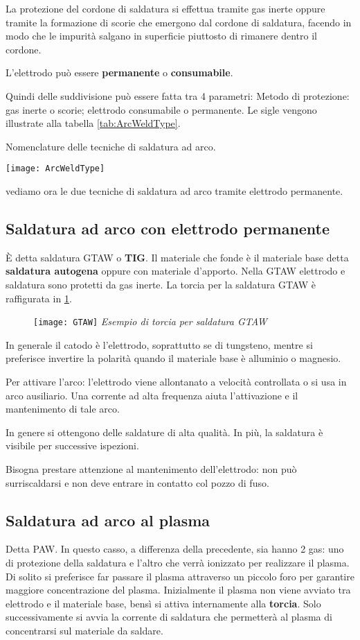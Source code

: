 La protezione del cordone di saldatura si effettua tramite gas inerte oppure tramite la formazione di scorie che emergono dal cordone di saldatura, facendo in modo che le impurità salgano in superficie piuttosto di rimanere dentro il cordone.

L'elettrodo può essere \textbf{permanente} o \textbf{consumabile}.

Quindi delle suddivisione può essere fatta tra 4 parametri: Metodo di protezione: gas inerte o scorie; elettrodo consumabile o permanente.
Le sigle vengono illustrate alla tabella \ref{tab:ArcWeldType}.

\begin{table}
\centering
\caption{Nomenclature delle tecniche di saldatura ad arco.}
\label{tab:ArcWeldType}
\texttt{[image: ArcWeldType]}
\end{table}

vediamo ora le due tecniche di saldatura ad arco tramite elettrodo permanente.

\subsection{Saldatura ad arco con elettrodo permanente}
È detta saldatura \ac{GTAW} o \textbf{TIG}.
Il materiale che fonde è il materiale base detta \textbf{saldatura autogena} oppure con materiale d'apporto.
Nella \ac{GTAW} elettrodo e saldatura sono protetti da gas inerte.
La torcia per la saldatura \ac{GTAW} è raffigurata in \ref{fig:GTAW}.
\begin{figure}
\centering
\texttt{[image: GTAW]}
\emph{Esempio di torcia per saldatura \ac{GTAW}}\label{fig:GTAW}
\end{figure}

In generale il catodo è l'elettrodo, soprattutto se di tungsteno, mentre si preferisce invertire la polarità quando il materiale base è alluminio o magnesio.

Per attivare l'arco: l'elettrodo viene allontanato a velocità controllata o si usa in arco ausiliario.
Una corrente ad alta frequenza aiuta l'attivazione e il mantenimento di tale arco.

In genere si ottengono delle saldature di alta qualità.
In più, la saldatura è visibile per successive ispezioni.

Bisogna prestare attenzione al mantenimento dell'elettrodo: non può surriscaldarsi e non deve entrare in contatto col pozzo di fuso.

\subsection{Saldatura ad arco al plasma}
Detta \ac{PAW}.
In questo casso, a differenza della precedente, sia hanno 2 gas: uno di protezione della saldatura e l'altro che verrà ionizzato per realizzare il plasma.
Di solito si preferisce far passare il plasma attraverso un piccolo foro per garantire maggiore concentrazione del plasma.
Inizialmente il plasma non viene avviato tra elettrodo e il materiale base, bensì si attiva internamente alla \textbf{torcia}. Solo successivamente si avvia la corrente di saldatura che permetterà al plasma di concentrarsi sul materiale da saldare.

